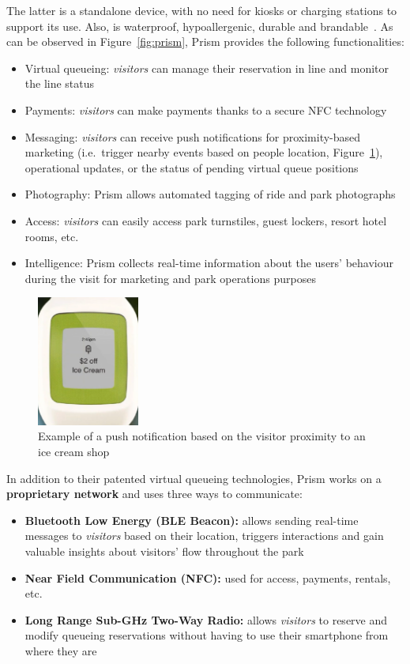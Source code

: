 The latter is a standalone device, with no need for kiosks or charging stations to support its use.
Also, is waterproof, hypoallergenic, durable and brandable~\cite{prism-desc}.
As can be observed in Figure~\ref{fig:prism}, Prism provides the following functionalities:
\begin{itemize}
    \item Virtual queueing: \textit{visitors} can manage their reservation in line and monitor the line status
    \item Payments: \textit{visitors} can make payments thanks to a secure NFC technology
    \item Messaging: \textit{visitors} can receive push notifications for proximity-based marketing (i.e.\ trigger nearby events based on people location, Figure~\ref{fig:prism-icecream}), operational updates, or the status of pending virtual queue positions
    \item Photography: Prism allows automated tagging of ride and park photographs
    \item Access: \textit{visitors} can easily access park turnstiles, guest lockers, resort hotel rooms, etc.
    \item Intelligence: Prism collects real-time information about the users' behaviour during the visit for marketing and park operations purposes
\end{itemize}

\begin{figure}[H]
    \centering
    \includegraphics[width=0.3\textwidth]{img/prism-icecream}
    \caption{Example of a push notification based on the visitor proximity to an ice cream shop}
    \label{fig:prism-icecream}
\end{figure}

In addition to their patented virtual queueing technologies, Prism works on a \textbf{proprietary network} and uses three ways to communicate:
\begin{itemize}
    \item \textbf{Bluetooth Low Energy (BLE Beacon):} allows sending real-time messages to \textit{visitors} based on their location, triggers interactions and gain valuable insights about visitors' flow throughout the park
    \item \textbf{Near Field Communication (NFC):} used for access, payments, rentals, etc.
    \item \textbf{Long Range Sub-GHz Two-Way Radio:} allows \textit{visitors} to reserve and modify queueing reservations without having to use their smartphone from where they are
\end{itemize}

